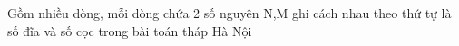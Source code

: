 Gồm nhiều dòng, mỗi dòng chứa 2 số nguyên N,M ghi cách nhau theo thứ tự là số đĩa và số cọc trong bài toán tháp Hà Nội  

\